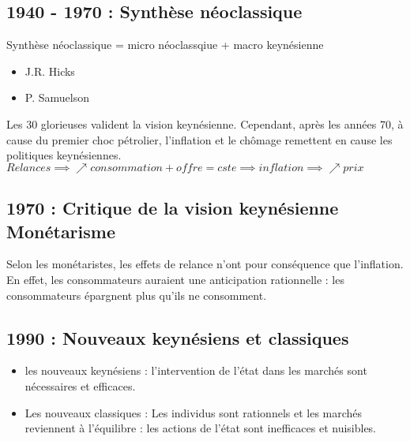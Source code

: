 \subsection{1940 - 1970 : Synthèse néoclassique}
\textcolor{BrickRed}{Synthèse néoclassique = micro néoclassqiue + macro keynésienne}
\begin{itemize}
    \item J.R. Hicks
    \item P. Samuelson
\end{itemize}
Les 30 glorieuses valident la vision keynésienne.
Cependant, après les années 70, à cause du premier choc pétrolier, l'inflation et le chômage remettent en cause les politiques keynésiennes. \newline
\textbf{$Relances \implies \nearrow consommation +  offre = cste \implies inflation \implies \nearrow prix$}
\subsection{1970 : Critique de la vision keynésienne \textcolor{BrickRed}{Monétarisme}}
Selon \textcolor{BrickRed}{les monétaristes}, les effets de relance n'ont pour conséquence que l'inflation. En effet, les consommateurs auraient une anticipation rationnelle : les consommateurs épargnent plus qu'ils ne consomment.
\subsection{1990 : \textcolor{BrickRed}{Nouveaux keynésiens et classiques}}
\begin{itemize}
    \item \textcolor{BrickRed}{les nouveaux keynésiens} : l'intervention de l'état dans les marchés sont nécessaires et efficaces.
    \item \textcolor{BrickRed}{Les nouveaux classiques} : Les individus sont rationnels et les marchés reviennent à l'équilibre : les actions de l'état sont inefficaces et nuisibles.
\end{itemize}

